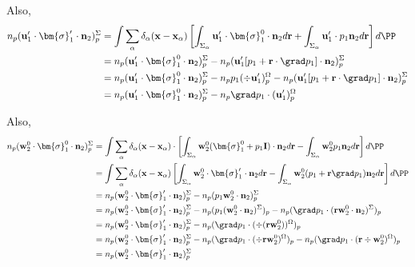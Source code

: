 Also, 
\begin{align*}
    n_p (\textbf{u}_1' \cdot \bm{\sigma}_1'\cdot \textbf{n}_2)^\Sigma_p
    &= \int
    \sum_\alpha \delta_\alpha(\textbf{x} - \textbf{x}_\alpha)
    \left[\int_{\Sigma_\alpha} 
    \textbf{u}_1'\cdot
    \bm{\sigma}_1^0\cdot \textbf{n}_2
    d\textbf{r}
    + \int_{\Sigma_\alpha} 
    \textbf{u}_1'\cdot
     p_1  \textbf{n}_2
     d\textbf{r}\right]
     d\PP \\
    &= n_p (\textbf{u}_1' \cdot \bm{\sigma}_1^0 \cdot \textbf{n}_2)^\Sigma_p
    -  n_p (\textbf{u}_1'[p_1  +  \textbf{r}\cdot \grad p_1 ]\cdot \textbf{n}_2 )_p^\Sigma
     \\
    &= n_p (\textbf{u}_1' \cdot \bm{\sigma}_1^0 \cdot \textbf{n}_2)^\Sigma_p
    -  n_p p_1  (\div \textbf{u}_1')_p^\Omega
    -  n_p (\textbf{u}_1'[p_1  +  \textbf{r}\cdot \grad p_1 ]\cdot \textbf{n}_2 )_p^\Sigma\\
    &= n_p (\textbf{u}_1' \cdot \bm{\sigma}_1^0 \cdot \textbf{n}_2)^\Sigma_p
    -  n_p\grad p_1\cdot ( \textbf{u}'_1)_p^\Omega
     \\
\end{align*}

Also, 
\begin{align*}
    n_p (\textbf{w}_2^0 \cdot \bm{\sigma}_1^0\cdot \textbf{n}_2)^\Sigma_p
    &= \int
    \sum_\alpha \delta_\alpha(\textbf{x} - \textbf{x}_\alpha)
    \cdot
    \left[\int_{\Sigma_\alpha} 
     \textbf{w}_2^0 (\bm{\sigma}_1^0 +p_1 \textbf{I})\cdot \textbf{n}_2
     d\textbf{r}
    - \int_{\Sigma_\alpha} 
     \textbf{w}_2^0 p_1  \textbf{n}_2
     d\textbf{r}\right]
     d\PP \\
    &= \int
    \sum_\alpha \delta_\alpha(\textbf{x} - \textbf{x}_\alpha)
    \left[\int_{\Sigma_\alpha} 
     \textbf{w}_2^0 \cdot \bm{\sigma}_1'\cdot \textbf{n}_2
     d\textbf{r}
    - \int_{\Sigma_\alpha} 
     \textbf{w}_2^0 (p_1 + \textbf{r}\grad p_1)   \textbf{n}_2
     d\textbf{r}\right]
     d\PP \\
     &= n_p (\textbf{w}_2^0 \cdot \bm{\sigma}_1' \cdot \textbf{n}_2)^\Sigma_p
    - n_p (p_1 \textbf{w}_2^0 \cdot \textbf{n}_2)^\Sigma_p\\
     &= n_p (\textbf{w}_2^0 \cdot \bm{\sigma}_1' \cdot \textbf{n}_2)^\Sigma_p
    - n_p (p_1 (\textbf{w}_2^0 \cdot \textbf{n}_2)^\Sigma)_p
    - n_p (\grad p_1\cdot ( \textbf{r} \textbf{w}_2^0 \cdot \textbf{n}_2)^\Sigma)_p\\
     &= n_p (\textbf{w}_2^0 \cdot \bm{\sigma}_1' \cdot \textbf{n}_2)^\Sigma_p
    - n_p (\grad p_1\cdot ( \div(\textbf{r} \textbf{w}_2^0))^\Omega)_p\\
     &= n_p (\textbf{w}_2^0 \cdot \bm{\sigma}_1' \cdot \textbf{n}_2)^\Sigma_p
    - n_p (\grad p_1\cdot ( \div\textbf{r} \textbf{w}_2^0)^\Omega)_p
    - n_p (\grad p_1\cdot ( \textbf{r} \div\textbf{w}_2^0)^\Omega)_p\\
     &= n_p (\textbf{w}_2^0 \cdot \bm{\sigma}_1' \cdot \textbf{n}_2)^\Sigma_p
\end{align*}







